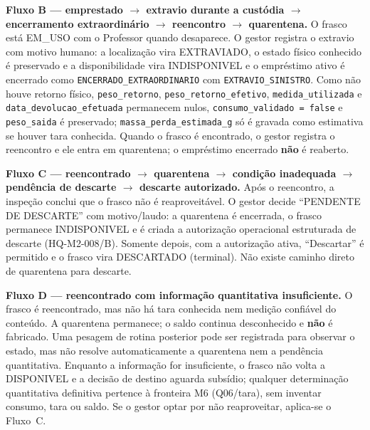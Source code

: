 \textbf{Fluxo B --- emprestado $\rightarrow$ extravio durante a custódia $\rightarrow$ encerramento extraordinário $\rightarrow$ reencontro $\rightarrow$ quarentena.} O frasco está EM\_USO com o Professor quando desaparece. O gestor registra o extravio com motivo humano: a localização vira EXTRAVIADO, o estado físico conhecido é preservado e a disponibilidade vira INDISPONIVEL e o empréstimo ativo é encerrado como \texttt{ENCERRADO\_EXTRAORDINARIO} com \texttt{EXTRAVIO\_SINISTRO}. Como não houve retorno físico, \texttt{peso\_retorno}, \texttt{peso\_retorno\_efetivo}, \texttt{medida\_utilizada} e \texttt{data\_devolucao\_efetuada} permanecem nulos, \texttt{consumo\_validado = false} e \texttt{peso\_saida} é preservado; \texttt{massa\_perda\_estimada\_g} só é gravada como estimativa se houver tara conhecida. Quando o frasco é encontrado, o gestor registra o reencontro e ele entra em quarentena; o empréstimo encerrado \textbf{não} é reaberto.

\textbf{Fluxo C --- reencontrado $\rightarrow$ quarentena $\rightarrow$ condição inadequada $\rightarrow$ pendência de descarte $\rightarrow$ descarte autorizado.} Após o reencontro, a inspeção conclui que o frasco não é reaproveitável. O gestor decide ``PENDENTE DE DESCARTE'' com motivo/laudo: a quarentena é encerrada, o frasco permanece INDISPONIVEL e é criada a autorização operacional estruturada de descarte (HQ-M2-008/B). Somente depois, com a autorização ativa, ``Descartar'' é permitido e o frasco vira DESCARTADO (terminal). Não existe caminho direto de quarentena para descarte.

\textbf{Fluxo D --- reencontrado com informação quantitativa insuficiente.} O frasco é reencontrado, mas não há tara conhecida nem medição confiável do conteúdo. A quarentena permanece; o saldo continua desconhecido e \textbf{não} é fabricado. Uma pesagem de rotina posterior pode ser registrada para observar o estado, mas não resolve automaticamente a quarentena nem a pendência quantitativa. Enquanto a informação for insuficiente, o frasco não volta a DISPONIVEL e a decisão de destino aguarda subsídio; qualquer determinação quantitativa definitiva pertence à fronteira M6 (Q06/tara), sem inventar consumo, tara ou saldo. Se o gestor optar por não reaproveitar, aplica-se o Fluxo~C.

